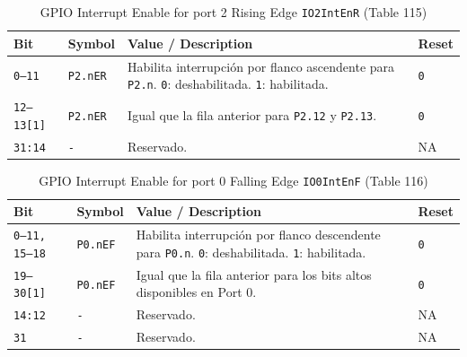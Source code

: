 \begin{table}[H]
  \centering
  \small
  \caption{GPIO Interrupt Enable for port 2 Rising Edge \texttt{IO2IntEnR} (Table 115)}
  \begin{tabularx}{0.96\textwidth}{|>{\centering\arraybackslash}p{}|>{\raggedright\arraybackslash}p{}|>{\raggedright\arraybackslash}X|>{\centering\arraybackslash}p{}|}
    \hline
    \textbf{Bit} & \textbf{Symbol} & \textbf{Value / Description} & \textbf{Reset} \\
    \hline
    \texttt{0--11} & \texttt{P2.nER} & Habilita interrupción por flanco ascendente para \texttt{P2.n}. \texttt{0}: deshabilitada. \texttt{1}: habilitada. & \texttt{0} \\
    \hline
    \texttt{12--13[1]} & \texttt{P2.nER} & Igual que la fila anterior para \texttt{P2.12} y \texttt{P2.13}. & \texttt{0} \\
    \hline
    \texttt{31:14} & \texttt{-} & Reservado. & NA \\
    \hline
  \end{tabularx}
\end{table}

\begin{table}[H]
  \centering
  \small
  \caption{GPIO Interrupt Enable for port 0 Falling Edge \texttt{IO0IntEnF} (Table 116)}
  \begin{tabularx}{0.96\textwidth}{|>{\centering\arraybackslash}p{}|>{\raggedright\arraybackslash}p{}|>{\raggedright\arraybackslash}X|>{\centering\arraybackslash}p{}|}
    \hline
    \textbf{Bit} & \textbf{Symbol} & \textbf{Value / Description} & \textbf{Reset} \\
    \hline
    \texttt{0--11, 15--18} & \texttt{P0.nEF} & Habilita interrupción por flanco descendente para \texttt{P0.n}. \texttt{0}: deshabilitada. \texttt{1}: habilitada. & \texttt{0} \\
    \hline
    \texttt{19--30[1]} & \texttt{P0.nEF} & Igual que la fila anterior para los bits altos disponibles en Port 0. & \texttt{0} \\
    \hline
    \texttt{14:12} & \texttt{-} & Reservado. & NA \\
    \hline
    \texttt{31} & \texttt{-} & Reservado. & NA \\
    \hline
  \end{tabularx}
\end{table}

